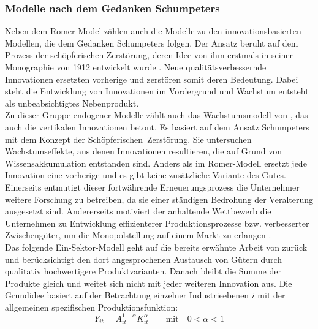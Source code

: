 \subsubsection*{Modelle nach dem Gedanken Schumpeters}\label{sec:schumpeter}
Neben dem Romer-Model zählen auch die Modelle zu den innovationsbasierten Modellen, die dem Gedanken Schumpeters folgen. Der Ansatz beruht auf dem Prozess der schöpferischen Zerstörung, deren Idee von ihm erstmals in seiner Monographie von 1912 entwickelt wurde \cite{Schumpeter.1934a}. Neue qualitätsverbessernde Innovationen ersetzten vorherige und zerstören somit deren Bedeutung. Dabei steht die Entwicklung von Innovationen im Vordergrund und Wachstum entsteht als unbeabsichtigtes Nebenprodukt.\\
%
Zu dieser Gruppe endogener Modelle zählt auch das Wachstumsmodell von \cite{Aghion.1992}, das auch die vertikalen Innovationen betont. Es basiert auf dem Ansatz Schumpeters mit dem Konzept der Schöpferischen~Zerstörung. Sie untersuchen Wachstumseffekte, aus denen Innovationen resultieren, die auf Grund von Wissensakkumulation entstanden sind. Anders als im Romer-Modell ersetzt jede Innovation eine vorherige und es gibt keine zusätzliche Variante des Gutes. Einerseits entmutigt dieser fortwährende Erneuerungsprozess die Unternehmer weitere Forschung zu betreiben, da sie einer ständigen Bedrohung der Veralterung ausgesetzt sind. Andererseits motiviert der anhaltende Wettbewerb die Unternehmen zu Entwicklung effizienterer Produktionsprozesse bzw. verbesserter Zwischengüter, um die Monopolstellung auf einem Markt zu erlangen \cite{Aghion.1992}.\\ 
%
Das folgende Ein-Sektor-Modell geht auf die bereits erwähnte Arbeit von \cite{Aghion.1992,Aghion.1998} zurück und berücksichtigt den dort angesprochenen Austausch von Gütern durch qualitativ hochwertigere Produktvarianten. Danach bleibt die Summe der Produkte gleich und weitet sich nicht mit jeder weiteren Innovation aus. Die Grundidee basiert auf der Betrachtung einzelner Industrieebenen $i$ mit der allgemeinen spezifischen Produktionsfunktion:
%
	\begin{equation}
		Y_{it}=A_{it}^{1-\alpha}K_{it}^\alpha \qquad \text{mit}\quad 0 < \alpha < 1 \label{Produktionsfunktion Industrien Schumpeter}
	\end{equation}
%
